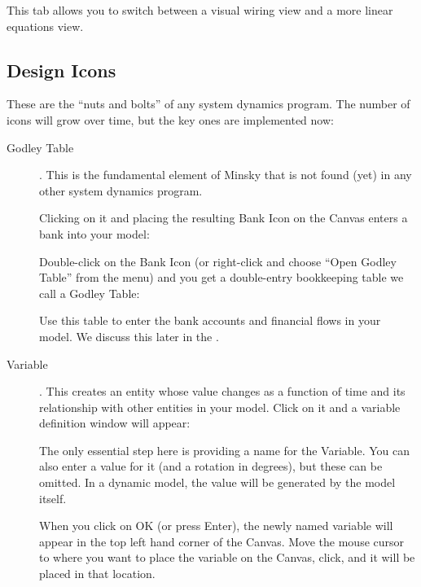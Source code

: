 
This tab allows you to switch between a visual wiring view and a more 
linear equations view.

\subsection{Design Icons}


These are the ``nuts and bolts'' of any system dynamics program. The
number of icons will grow over time, but the key ones are implemented
now: 

\begin{description}
\item[Godley Table] . \label{GodleyTable} This is the
fundamental element of Minsky that is not found (yet) in any other
system dynamics program. 

Clicking on it and placing the resulting Bank Icon on the Canvas
enters a bank into your model:



Double-click on the Bank Icon (or right-click and choose ``Open Godley
Table'' from the menu) and you get a double-entry bookkeeping table we
call a Godley Table: 


 
Use this table to enter the bank accounts and financial flows in your model. We discuss this later in the .

\item[Variable]  . \label{Variable} This creates an entity
whose value changes as a function of time and its relationship with
other entities in your model. Click on it and a variable definition
window will appear:


The only essential step here is providing a name for the Variable. You
can also enter a value for it (and a rotation in degrees), but these
can be omitted. In a dynamic model, the value will be generated by the
model itself.


When you click on OK (or press Enter), the newly named variable will
appear in the top left hand corner of the Canvas. Move the mouse
cursor to where you want to place the variable on the Canvas, click,
and it will be placed in that location.



\end{description}
